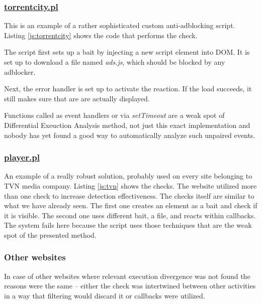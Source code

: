 \subsubsection{\url{torrentcity.pl}}
This is an example of a rather sophisticated custom anti-adblocking script.
Listing \ref{js:torrentcity} shows the code that performs the check.


                       
The script first sets up a bait by injecting a new script element into DOM. It is set up to download
a file named \emph{ads.js}, which should be blocked by any adblocker.

Next, the error handler is set up to activate the reaction. If the load succeeds, it still
makes sure that are are actually displayed.

Functions called as event handlers or via \emph{setTimeout} are a weak spot of Differential Exeuction Analysis method,
not just this exact implementation and nobody has yet found a good way to automatically
analyze such unpaired events.

\subsubsection{\url{player.pl}}
An example of a really robust solution, probably used on every site belonging to TVN media company.
Listing \ref{js:tvn} shows the checks. The website utilized more than one check
to increase detection effectiveness.
The checks itself are similar to what we have already seen. The first one creates an element as a bait 
and check if it is visible. The second one uses different bait, a file, and reacts within callbacks.
The system fails here because the script uses those techniques that are the weak spot of the presented method.



\subsubsection{Other websites}
In case of other websites where relevant execution divergence was not found 
the reasons were the same -- either the check was intertwined between other activities
in a way that filtering would discard it or callbacks were utilized.

